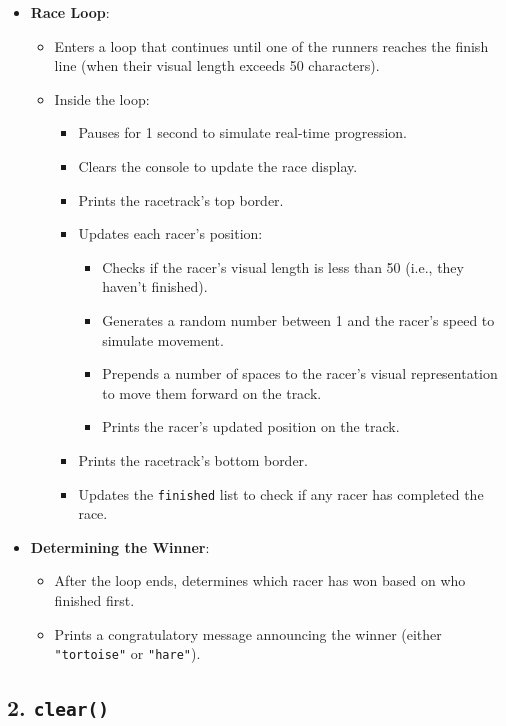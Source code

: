 \begin{homeworkProblem}
\begin{itemize}
  \item \textbf{Race Loop}:
    \begin{itemize}
      \item Enters a loop that continues until one of the runners reaches the finish line (when their visual length exceeds 50 characters).
      \item Inside the loop:
        \begin{itemize}
          \item Pauses for 1 second to simulate real-time progression.
          \item Clears the console to update the race display.
          \item Prints the racetrack's top border.
          \item Updates each racer's position:
            \begin{itemize}
              \item Checks if the racer's visual length is less than 50 (i.e., they haven't finished).
              \item Generates a random number between 1 and the racer's speed to simulate movement.
              \item Prepends a number of spaces to the racer's visual representation to move them forward on the track.
              \item Prints the racer's updated position on the track.
            \end{itemize}
          \item Prints the racetrack's bottom border.
          \item Updates the \texttt{finished} list to check if any racer has completed the race.
        \end{itemize}
    \end{itemize}

  \item \textbf{Determining the Winner}:
    \begin{itemize}
      \item After the loop ends, determines which racer has won based on who finished first.
      \item Prints a congratulatory message announcing the winner (either \texttt{"tortoise"} or \texttt{"hare"}).
    \end{itemize}
\end{itemize}

\bigskip

\subsection*{2. \texttt{clear()}}


\end{homeworkProblem}
